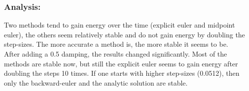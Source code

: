 \documentclass{article}
\begin{document}
\subsubsection{Analysis:}
Two methods tend to gain energy over the time (explicit euler and midpoint euler), the others seem relatively stable and do not gain energy by doubling the step-sizes. The more accurate a method is, the more stable it seems to be. \\
After adding a 0.5 damping, the results changed significantly. Most of the methods are stable now, but still the explicit euler seems to gain energy after doubling the steps 10 times. If one starts with higher step-sizes (0.0512), then only the backward-euler and the analytic solution are stable.
\end{document}
